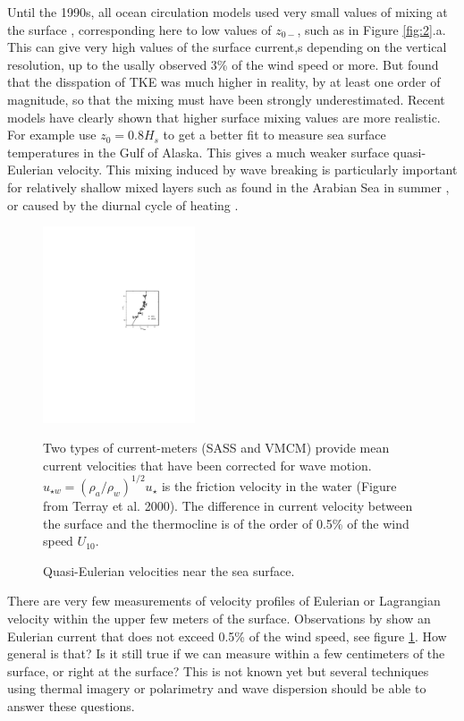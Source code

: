 Until the 1990s, all ocean circulation models used very small values of mixing at the surface \citep[e.g.][]{Large&al.1994}, corresponding 
here to low values of $z_{0-}$, such as in Figure \ref{fig:2}.a. This can give very high values of the surface current,s depending on the vertical resolution, 
up to the usally observed 3\% of the wind speed 
\citep{Huang1979} or more. But \cite{Agrawal&al.1992} found that the disspation of TKE was much higher in reality, by at least 
one order of magnitude, so that the mixing must have been strongly underestimated.  Recent models have clearly shown that 
higher surface mixing values are more realistic. For example \cite{Mellor&Blumberg2004} use  $z_0=0.8 H_s$ to get a better fit to measure sea surface temperatures 
in the Gulf of Alaska. This gives a much weaker surface quasi-Eulerian velocity.  This mixing induced by wave breaking is particularly important for 
relatively shallow mixed layers such as found in the Arabian Sea in summer \citep{Janssen2012}, or caused by the diurnal cycle of heating \citep{Noh1996,Noh&Kim1999}.

\begin{figure}
\centerline{\includegraphics[width=0.4\textwidth]{FIGS_CH_AIRSEA/Terray_etal2000_p5.pdf}}
  \caption{Quasi-Eulerian velocities near the sea surface.}{Two types of current-meters  (SASS and VMCM) provide mean current velocities that have been corrected for wave motion. $u_{\star w}=(\rho_a/\rho_w)^{1/2} u_{\star}$ is the friction velocity in the water (Figure from Terray et al. 2000)\nocite{Terray&al.2000}. The difference in current velocity between the surface and the thermocline is of the order of  0.5\% 
  of the wind speed $U_{10}$.} \label{fig_Santala}
\end{figure}
There are very few measurements of velocity profiles of Eulerian or Lagrangian velocity within the upper 
few meters of the surface. Observations by \cite{Santala&Terray1992} show an Eulerian current that does not exceed  0.5\% of the wind 
speed, see figure
\ref{fig_Santala}. 
How general is that? Is it still true if we can measure within a few centimeters of the surface, or right at the surface? 
This is not known yet but several techniques using thermal imagery or polarimetry and wave dispersion should be able to answer these questions. 


